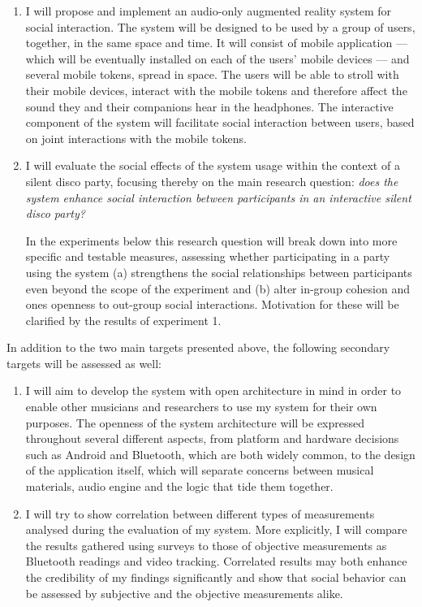 \documentclass[a4paper,11pt]{article}
\begin{document}
\begin{enumerate}[resume]
    \item I will propose and implement an audio-only augmented reality system for social interaction.
          The system will be designed to be used by a group of users, together, in the same space and time.
          It will consist of mobile application --- which will be eventually installed on each of the users' mobile devices --- and several mobile tokens, spread in space.
          The users will be able to stroll with their mobile devices, interact with the mobile tokens and therefore affect the sound they and their companions hear in the headphones.
          The interactive component of the system will facilitate social interaction between users, based on joint interactions with the mobile tokens.

    \item I will evaluate the social effects of the system usage within the context of a silent disco party, focusing thereby on the main research question: \emph{does the system enhance social interaction between participants in an interactive silent disco party?}

          In the experiments below this research question will break down into more specific and testable measures, assessing whether participating in a party using the system (a) strengthens the social relationships between participants even beyond the scope of the experiment and (b) alter in-group cohesion and ones openness to out-group social interactions.
          Motivation for these will be clarified by the results of experiment 1.
\end{enumerate}

In addition to the two main targets presented above, the following secondary targets will be assessed as well:

\begin{enumerate}[resume]
    \item I will aim to develop the system with open architecture in mind in order to enable other musicians and researchers to use my system for their own purposes.
          The openness of the system architecture will be expressed throughout several different aspects, from platform and hardware decisions such as Android and Bluetooth, which are both widely common, to the design of the application itself, which will separate concerns between musical materials, audio engine and the logic that tide them together.
    \item I will try to show correlation between different types of measurements analysed during the evaluation of my system.
          More explicitly, I will compare the results gathered using surveys to those of objective measurements as Bluetooth readings and video tracking.
          Correlated results may both enhance the credibility of my findings significantly and show that social behavior can be assessed by subjective and the objective measurements alike.
\end{enumerate}
\end{document}
